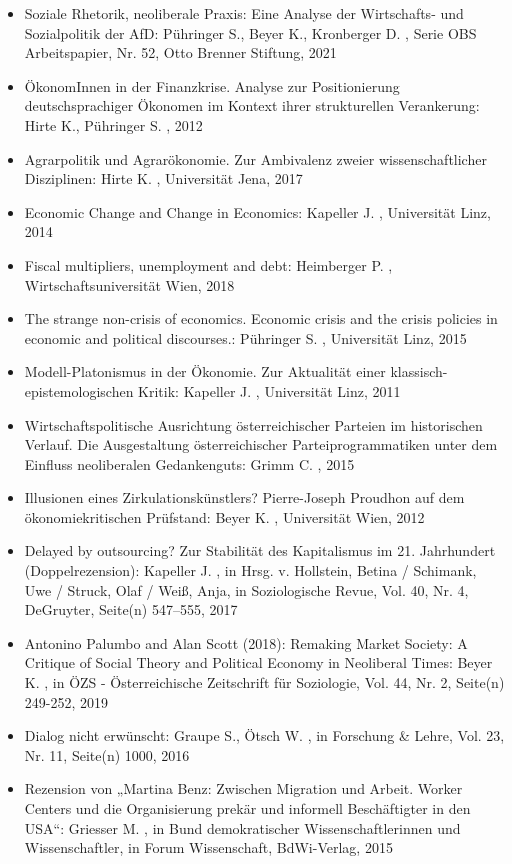 \begin{itemize}
\item Soziale Rhetorik, neoliberale Praxis: Eine Analyse der Wirtschafts- und Sozialpolitik der AfD: Pühringer S., Beyer K., Kronberger D. , Serie OBS Arbeitspapier, Nr. 52, Otto Brenner Stiftung, 2021
\item ÖkonomInnen in der Finanzkrise. Analyse zur Positionierung deutschsprachiger Ökonomen im Kontext ihrer strukturellen Verankerung: Hirte K., Pühringer S. , 2012
\item Agrarpolitik und Agrarökonomie. Zur Ambivalenz zweier wissenschaftlicher Disziplinen: Hirte K. , Universität Jena, 2017
\item Economic Change and Change in Economics: Kapeller J. , Universität Linz, 2014
\item Fiscal multipliers, unemployment and debt: Heimberger P. , Wirtschaftsuniversität Wien, 2018
\item The strange non-crisis of economics. Economic crisis and the crisis policies in economic and political discourses.: Pühringer S. , Universität Linz, 2015
\item Modell-Platonismus in der Ökonomie. Zur Aktualität einer klassisch-epistemologischen Kritik: Kapeller J. , Universität Linz, 2011
\item Wirtschaftspolitische Ausrichtung österreichischer Parteien im historischen Verlauf. Die Ausgestaltung österreichischer Parteiprogrammatiken unter dem Einfluss neoliberalen Gedankenguts: Grimm C. , 2015
\item Illusionen eines Zirkulationskünstlers? Pierre-Joseph Proudhon auf dem ökonomiekritischen Prüfstand: Beyer K. , Universität Wien, 2012
\item Delayed by outsourcing? Zur Stabilität des Kapitalismus im 21. Jahrhundert (Doppelrezension): Kapeller J. , in Hrsg. v. Hollstein, Betina / Schimank, Uwe / Struck, Olaf / Weiß, Anja, in Soziologische Revue, Vol. 40, Nr. 4, DeGruyter, Seite(n) 547–555, 2017
\item Antonino Palumbo and Alan Scott (2018): Remaking Market Society: A Critique of Social Theory and Political Economy in Neoliberal Times: Beyer K. , in ÖZS - Österreichische Zeitschrift für Soziologie, Vol. 44, Nr. 2, Seite(n) 249-252, 2019
\item Dialog nicht erwünscht: Graupe S., Ötsch W. , in Forschung & Lehre, Vol. 23, Nr. 11, Seite(n) 1000, 2016
\item Rezension von „Martina Benz: Zwischen Migration und Arbeit. Worker Centers und die Organisierung prekär und informell Beschäftigter in den USA“: Griesser M. , in Bund demokratischer Wissenschaftlerinnen und Wissenschaftler, in Forum Wissenschaft, BdWi-Verlag, 2015

\end{itemize}
